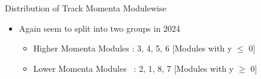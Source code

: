 \begin{frame}{Distribution of Track Momenta Modulewise}
    \begin{itemize}
        \small
        \item Again seem to split into two groups in 2024
        \begin{itemize}
            \item Higher Momenta Modules : 3, 4, 5, 6  [Modules with y $\leq$ 0]
            \item Lower Momenta Modules \ : 2, 1, 8, 7 [Modules with y $\geq$ 0]
        \end{itemize}
    \end{itemize}
\end{frame}